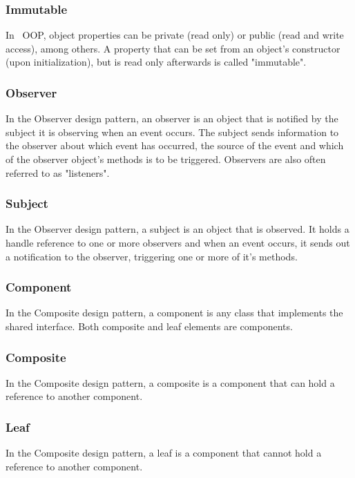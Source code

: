 \subsubsection*{Immutable}
In \matlab\ OOP, object properties can be private (read only) or public (read and write access), among others. A property that can be set from an object's constructor (upon initialization), but is read only afterwards is called "immutable".

\subsubsection*{Observer}
In the Observer design pattern, an observer is an object that is notified by the subject it is observing when an event occurs. The subject sends information to the observer about which event has occurred, the source of the event and which of the observer object's methods is to be triggered. Observers are also often referred to as "listeners".

\subsubsection*{Subject}
In the Observer design pattern, a subject is an object that is observed. It holds a handle reference to one or more observers and when an event occurs, it sends out a notification to the observer, triggering one or more of it's methods.

\subsubsection*{Component}
In the Composite design pattern, a component is any class that implements the shared interface. Both composite and leaf elements are components.

\subsubsection*{Composite}
In the Composite design pattern, a composite is a component that can hold a reference to another component.

\subsubsection*{Leaf}
In the Composite design pattern, a leaf is a component that cannot hold a reference to another component.
